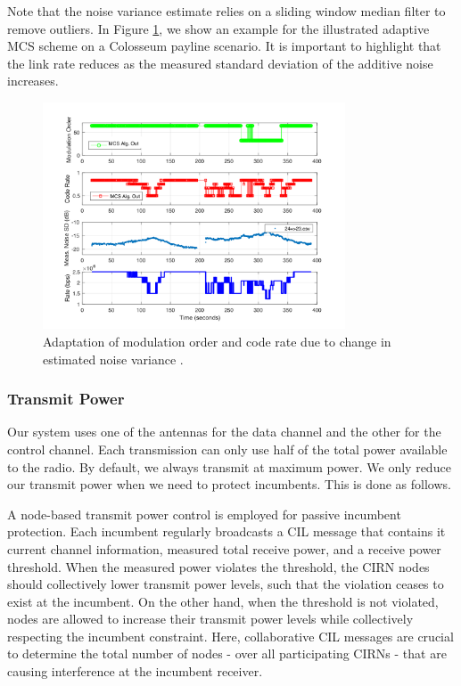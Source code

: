 \documentclass[11pt]{article}
\begin{document}
Note that the noise variance estimate relies on a sliding window median filter to remove outliers. In Figure \ref{fig:adaptivemcs}, we show an example for the illustrated adaptive MCS scheme on a Colosseum payline scenario. It is important to highlight that the link rate reduces as the measured standard deviation of the additive noise increases.
\begin{figure} [htb]
     \centerline{
     \includegraphics[width = 0.8\textwidth]{Figures/MCS.png}}
     \caption{Adaptation of modulation order and code rate due to change in estimated noise variance \cite[Figure $8$]{func-report}.}
     \label{fig:adaptivemcs}
     \end{figure}
\subsubsection{Transmit Power}
Our system uses one of the antennas for the data channel and the other for the control channel. Each transmission can only use half of the total power available to the radio. By default, we always transmit at maximum power. We only reduce our transmit power when we need to protect incumbents. This is done as follows.

A node-based transmit power control is employed for passive incumbent protection. Each incumbent regularly broadcasts a CIL message that contains it current channel information, measured total receive power, and a receive power threshold. When the measured power violates the threshold, the CIRN nodes should collectively lower transmit power levels, such that the violation ceases to exist at the incumbent. On the other hand, when the threshold is not violated, nodes are allowed to increase their transmit power levels while collectively respecting the incumbent constraint. Here, collaborative CIL messages are crucial to determine the total number of nodes - over all participating CIRNs - that are causing interference at the incumbent receiver.
\end{document}
